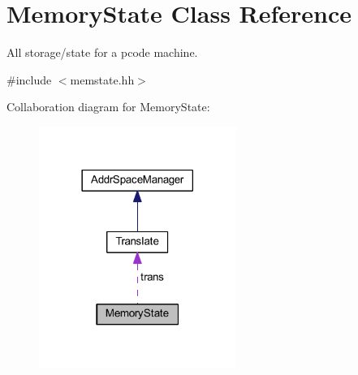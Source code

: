 \hypertarget{class_memory_state}{}\section{Memory\+State Class Reference}
\label{class_memory_state}


All storage/state for a pcode machine.  




{\ttfamily \#include $<$memstate.\+hh$>$}



Collaboration diagram for Memory\+State\+:
\nopagebreak
\begin{figure}[H]
\begin{center}
\leavevmode
\includegraphics[width=182pt]{class_memory_state__coll__graph}
\end{center}
\end{figure}
